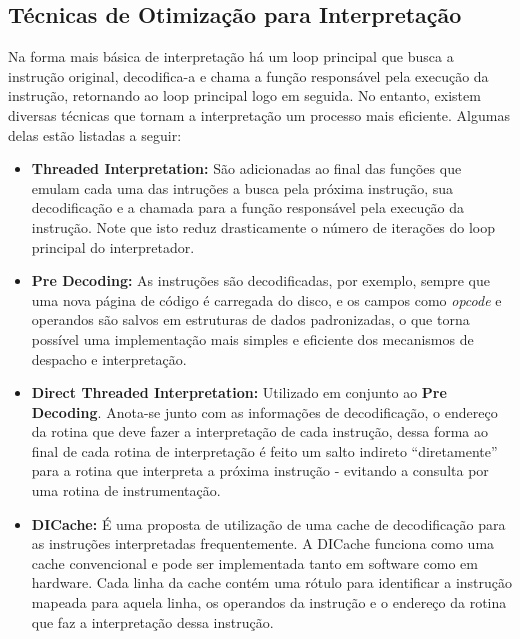 \documentclass[11pt,twoside]{article}
\begin{document}
\subsection{Técnicas de Otimização para Interpretação}

Na forma mais básica de interpretação há um loop principal que busca a instrução original, decodifica-a e chama 
a função responsável pela execução da instrução, retornando ao loop principal logo em seguida. No entanto, 
existem diversas técnicas que tornam a interpretação um processo mais eficiente. Algumas delas estão listadas 
a seguir:

\begin{itemize}
 	\item \textbf{Threaded Interpretation:} São adicionadas ao final das funções que emulam cada uma das intruções a 
 	busca pela próxima instrução, sua decodificação e a chamada para a função responsável pela execução da instrução. 
 	Note que isto reduz drasticamente o número de iterações do loop principal do interpretador.

 	\item \textbf{Pre Decoding:} As instruções são decodificadas, por exemplo, sempre que uma nova página de código é 
 	carregada do disco, e os campos como \emph{opcode} e operandos são salvos em estruturas de dados padronizadas, o 
 	que torna possível uma implementação mais simples e eficiente dos mecanismos de despacho e interpretação. 
 	
 	\item \textbf{Direct Threaded Interpretation:} Utilizado em conjunto ao \textbf{Pre Decoding}. Anota-se junto com
 	as informações de decodificação, o endereço da rotina que deve fazer a interpretação de cada instrução, dessa forma
 	ao final de cada rotina de interpretação é feito um salto indireto ``diretamente'' para a rotina que interpreta a
 	próxima instrução - evitando a consulta por uma rotina de instrumentação.  

	\item \textbf{DICache:} É uma proposta de utilização de uma cache de decodificação para as instruções interpretadas
	frequentemente. A DICache \cite{dicache} funciona como uma cache convencional e pode ser implementada tanto em software como em 
	hardware. Cada linha da cache contém uma rótulo para identificar a instrução mapeada para aquela linha, os operandos
	da instrução e o endereço da rotina que faz a interpretação dessa instrução.
\end{itemize}
\end{document}
